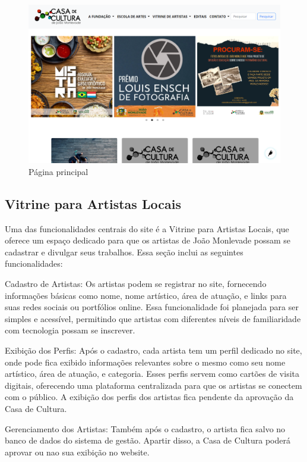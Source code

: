\begin{figure}[htb]
	\caption{\label{fig_grafico}Página principal}
	\begin{center}
	    \includegraphics[scale=0.35]{./img/pagina_principal.png}
	\end{center}
\end{figure}


\subsection{Vitrine para Artistas Locais}

Uma das funcionalidades centrais do site é a Vitrine para Artistas Locais, que oferece um espaço dedicado para que os artistas de João Monlevade possam se cadastrar e divulgar seus trabalhos. Essa seção inclui as seguintes funcionalidades:

Cadastro de Artistas: Os artistas podem se registrar no site, fornecendo informações básicas como nome, nome artístico, área de atuação, e links para suas redes sociais ou portfólios online. Essa funcionalidade foi planejada para ser simples e acessível, permitindo que artistas com diferentes níveis de familiaridade com tecnologia possam se inscrever.

Exibição dos Perfis: Após o cadastro, cada artista tem um perfil dedicado no site, onde pode fica exibido informações relevantes sobre o mesmo como seu nome artístico, área de atuação, e categoria. Esses perfis servem como cartões de visita digitais, oferecendo uma plataforma centralizada para que os artistas se conectem com o público. A exibição dos perfis dos artistas fica pendente da aprovação da Casa de Cultura.

Gerenciamento dos Artistas: Também após o cadastro, o artista fica salvo no banco de dados do sistema de gestão. Apartir disso, a Casa de Cultura poderá aprovar ou nao sua exibição no website.

